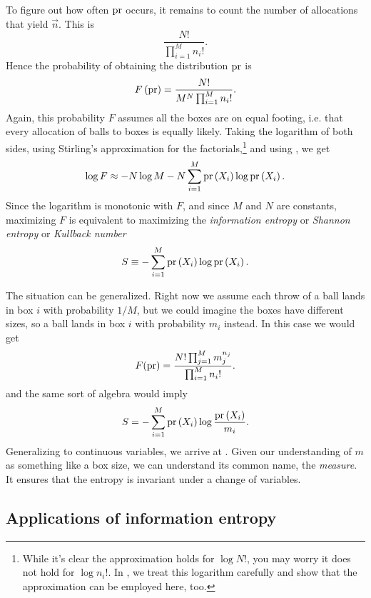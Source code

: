 To figure out how often $\pr$ occurs, it remains to count the number of
allocations that yield $\vec{n}$. This is
\begin{equation}
\frac{N!}{\prod_{i=1}^Mn_i!}.
\end{equation}
Hence the probability of obtaining the distribution $\pr$ is
\begin{equation}
F\left({\rm pr}\right)=\frac{N!}{M^N\prod_{i=1}^Mn_i!}.
\end{equation}
Again, this probability $F$ assumes all the boxes are on equal footing, i.e.
that every allocation of balls to boxes is equally likely.
Taking the logarithm of both sides, using Stirling's
approximation for the factorials,\footnote{While it's clear the approximation
holds for $\log N!$, you may worry it does not hold for $\log n_i!$. In
, we treat this logarithm carefully and show that
the approximation can be employed here, too.}
and using
, we get
\begin{equation}
\log F \approx  -N\log M -N\sum_{i=1}^M \pr{X_i}\log\pr{X_i}.
\end{equation}
Since the logarithm is monotonic with $F$, and since $M$ and $N$ are constants,
maximizing $F$ is equivalent to maximizing the {\it information
entropy} or {\it Shannon
entropy} or {\it Kullback number}
\begin{equation}
S\equiv  -\sum_{i=1}^M \pr{X_i}\log\pr{X_i}.
\end{equation}

The situation can be generalized. Right now we assume each throw of a ball lands
in box $i$ with probability $1/M$, but we could imagine the boxes have different
sizes, so a ball lands in box $i$ with probability $m_i$ instead. In this case
we would get
\begin{equation}
F(\pr)=\frac{N!\prod_{j=1}^M m_j^{n_j}}{\prod_{i=1}^M n_i!}.
\end{equation}
and the same sort of algebra would imply
\begin{equation}
S=  -\sum_{i=1}^M \pr{X_i}\log\frac{\pr{X_i}}{m_i}.
\end{equation}
Generalizing to continuous variables, we arrive at
. Given our understanding of $m$ as something
like a box size, we can understand its common name, the {\it
measure}. It 
ensures that the entropy is invariant under a change of variables.


\subsection{Applications of information entropy}

